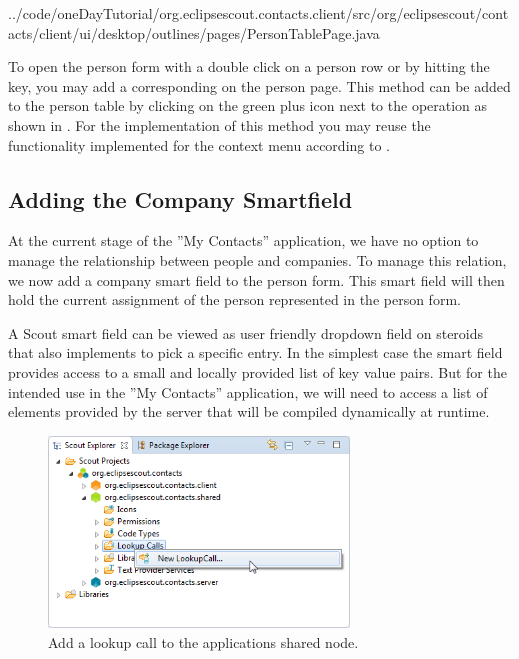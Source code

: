\documentclass[a4paper,10pt,twoside]{book}
\begin{document}

{../code/oneDayTutorial/org.eclipsescout.contacts.client/src/org/eclipsescout/contacts/client/ui/desktop/outlines/pages/PersonTablePage.java}

To open the person form with a double click on a person row or by hitting the  key, you may add a corresponding  on the person page. 
This method can be added to the person table by clicking on the green plus icon next to the operation  as shown in . 
For the implementation of this method you may reuse the functionality implemented for the context menu according to . 

\subsection{Adding the Company Smartfield}

At the current stage of the ''My Contacts'' application, we have no option to manage the relationship between people and companies. 
To manage this relation, we now add a company smart field to the person form. 
This smart field will then hold the current assignment of the person represented in the person form. 

A Scout smart field can be viewed as user friendly dropdown field on steroids that also implements  to pick a specific entry. 
In the simplest case the smart field provides access to a small and locally provided list of key value pairs. 
But for the intended use in the ''My Contacts'' application, we will need to access a list of elements provided by the server that will be compiled dynamically at runtime. 

\begin{figure}
\includegraphics[width=8cm]{new_lookupcall_company_contextmenu.png} 
\caption{Add a lookup call to the applications shared node.}
\end{figure}
\end{document}
